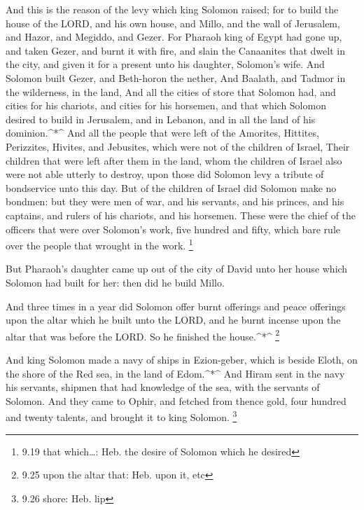  And this is the reason of the levy which king Solomon
raised; for to build the house of the LORD, and his own house, and
Millo, and the wall of Jerusalem, and Hazor, and Megiddo, and Gezer.
 For Pharaoh king of Egypt had gone up, and taken Gezer,
and burnt it with fire, and slain the Canaanites that dwelt in the city,
and given it for a present unto his daughter, Solomon's wife.
 And Solomon built Gezer, and Beth-horon the nether,
 And Baalath, and Tadmor in the wilderness, in the land,
 And all the cities of store that Solomon had, and cities
for his chariots, and cities for his horsemen, and that which Solomon
desired to build in Jerusalem, and in Lebanon, and in all the land of
his dominion.\^{}*\^{}  And all the people that were left
of the Amorites, Hittites, Perizzites, Hivites, and Jebusites, which
were not of the children of Israel,  Their children that
were left after them in the land, whom the children of Israel also were
not able utterly to destroy, upon those did Solomon levy a tribute of
bondservice unto this day.  But of the children of Israel
did Solomon make no bondmen: but they were men of war, and his servants,
and his princes, and his captains, and rulers of his chariots, and his
horsemen.  These were the chief of the officers that were
over Solomon's work, five hundred and fifty, which bare rule over the
people that wrought in the work. \footnote{9.19 that which\ldots: Heb.
  the desire of Solomon which he desired}

 But Pharaoh's daughter came up out of the city of David
unto her house which Solomon had built for her: then did he build Millo.

 And three times in a year did Solomon offer burnt
offerings and peace offerings upon the altar which he built unto the
LORD, and he burnt incense upon the altar that was before the LORD. So
he finished the house.\^{}*\^{} \footnote{9.25 upon the altar that: Heb.
  upon it, etc}

 And king Solomon made a navy of ships in Ezion-geber,
which is beside Eloth, on the shore of the Red sea, in the land of
Edom.\^{}*\^{}  And Hiram sent in the navy his servants,
shipmen that had knowledge of the sea, with the servants of Solomon.
 And they came to Ophir, and fetched from thence gold, four
hundred and twenty talents, and brought it to king Solomon. \footnote{9.26
  shore: Heb. lip}

